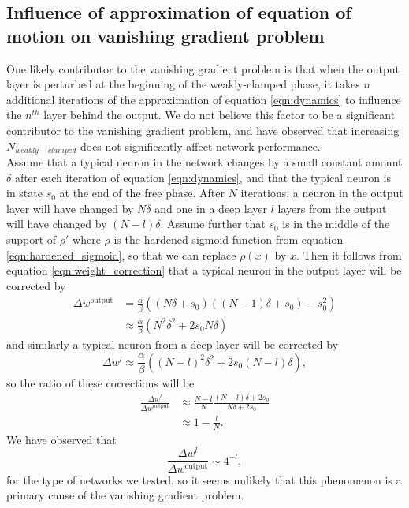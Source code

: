 \documentclass[format=sigconf]{acmart}
\newcommand{\npar}{\\\indent}
\begin{document}
\begin{appendices}
\section{Influence of approximation of equation of motion on vanishing gradient problem}
\label{app:discrete_vangrad}

One likely contributor to the vanishing gradient problem is that when the output layer is perturbed at the beginning of the weakly-clamped phase, it takes $n$ additional iterations of the approximation of equation \ref{eqn:dynamics} to influence the $n^{th}$ layer behind the output. We do not believe this factor to be a significant contributor to the vanishing gradient problem, and have observed that increasing $N_{weakly-clamped}$ does not significantly affect network performance.
\npar
Assume that a typical neuron in the network changes by a small constant amount $\delta$ after each iteration of equation \ref{eqn:dynamics}, and that the typical neuron is in state $s_0$ at the end of the free phase. After $N$ iterations, a neuron in the output layer will have changed by $N\delta$ and one in a deep layer $l$ layers from the output will have changed by $(N-l)\delta$. Assume further that $s_0$ is in the middle of the support of $\rho'$ where $\rho$ is the hardened sigmoid function from equation \ref{eqn:hardened_sigmoid}, so that we can replace $\rho(x)$ by $x$. Then it follows from equation \ref{eqn:weight_correction} that a typical neuron in the output layer will be corrected by 
\begin{equation}
\begin{aligned}
\Delta w^\text{output}&=\frac{\alpha}{\beta}((N\delta + s_0)((N-1)\delta + s_0)-s_0^2)
\\&
\approx \frac{\alpha}{\beta}(N^2\delta^2+2s_0N\delta)
\end{aligned}
\end{equation}
and similarly a typical neuron from a deep layer will be corrected by 
\begin{equation}
\Delta w^l\approx \frac{\alpha}{\beta}((N-l)^2\delta^2+2s_0(N-l)\delta),
\end{equation}
 so the ratio of these corrections will be
\begin{equation}
\begin{aligned}
\frac{\Delta w^l}{\Delta w^{\text{output}}}&\approx \frac{N-l}{N}\frac{(N-l)\delta+2s_0}{N\delta+2s_0}
\\&
\approx 1-\frac{l}{N}.
\end{aligned}
\end{equation}
We have observed that
\begin{equation}
\frac{\Delta w^l}{\Delta w^{\text{output}}}\sim 4^{-l},
\end{equation}
for the type of networks we tested, so it seems unlikely that this phenomenon is a primary cause of the vanishing gradient problem.



\end{appendices}
\end{document}

